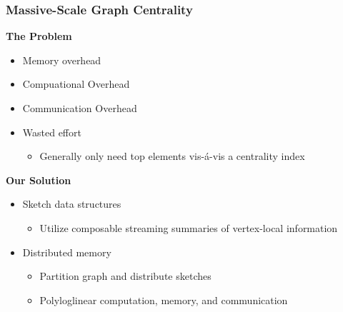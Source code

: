 \documentclass{beamer}
\begin{document}

 \begin{frame}
\frametitle{Massive-Scale Graph Centrality}

\textbf{The Problem}
\begin{itemize}
	\item Memory overhead
	\item Compuational Overhead
	\item Communication Overhead
	\item Wasted effort 
	\begin{itemize}
		\item Generally only need top elements vis-\'a-vis a centrality index
	\end{itemize}
\end{itemize}
\textbf{Our Solution}
\begin{itemize}
	\item Sketch data structures
	\begin{itemize}
		\item Utilize composable streaming summaries of vertex-local information
	\end{itemize}
	\item Distributed memory
	\begin{itemize}
		\item Partition graph and distribute sketches
		\item Polyloglinear computation, memory, and communication
	\end{itemize}
\end{itemize}

\end{frame}
\end{document}
